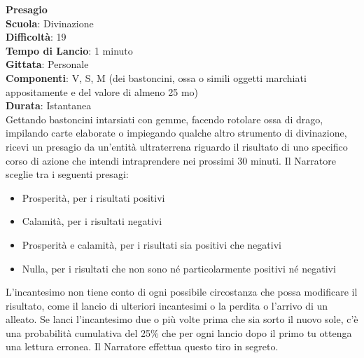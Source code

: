 \begin{multicols}{2}
\medskip\textbf{Presagio}\\
\textbf{Scuola}: Divinazione\\
\textbf{Difficoltà}: 19\\
\textbf{Tempo di Lancio}: 1 minuto\\
\textbf{Gittata}: Personale\\
\textbf{Componenti}: V, S, M (dei bastoncini, ossa o simili oggetti marchiati appositamente e del valore di almeno 25 mo)\\
\textbf{Durata}: Istantanea\\
Gettando bastoncini intarsiati con gemme, facendo rotolare ossa di drago, impilando carte elaborate o impiegando qualche altro strumento di divinazione, ricevi un presagio da un'entità ultraterrena riguardo il risultato di uno specifico corso di azione che intendi intraprendere nei prossimi 30 minuti. Il Narratore sceglie tra i seguenti presagi:
\medskip
\begin{itemize}
\item 
Prosperità, per i risultati positivi
\item 
Calamità, per i risultati negativi
\item 
Prosperità e calamità, per i risultati sia positivi che negativi
\item 
Nulla, per i risultati che non sono né particolarmente positivi né negativi
\end{itemize}
\medskip
L'incantesimo non tiene conto di ogni possibile circostanza che possa modificare il risultato, come il lancio di ulteriori incantesimi o la perdita o l'arrivo di un alleato. Se lanci l'incantesimo due o più volte prima che sia sorto il nuovo sole, c'è una probabilità cumulativa del 25\% che per ogni lancio dopo il primo tu ottenga una lettura erronea. Il Narratore effettua questo tiro in segreto.


\end{multicols}
